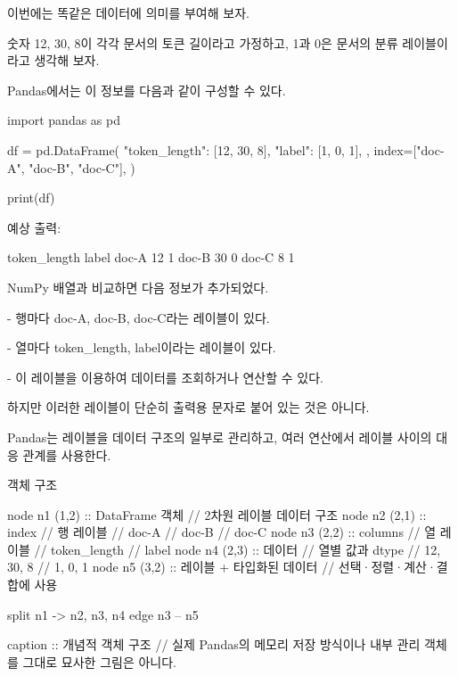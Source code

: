 이번에는 똑같은 데이터에 의미를 부여해 보자.

숫자 12, 30, 8이 각각 문서의 토큰 길이라고 가정하고, 1과 0은 문서의 분류 레이블이라고 생각해 보자.

Pandas에서는 이 정보를 다음과 같이 구성할 수 있다.

\begin{dhkcode}
import pandas as pd

df = pd.DataFrame(
    {
        "token_length": [12, 30, 8],
        "label": [1, 0, 1],
    },
    index=["doc-A", "doc-B", "doc-C"],
)

print(df)
\end{dhkcode}

예상 출력:

\begin{dhkzsh}
       token_length  label
doc-A            12      1
doc-B            30      0
doc-C             8      1
\end{dhkzsh}

NumPy 배열과 비교하면 다음 정보가 추가되었다.

\begin{dhksmry}
   - 행마다 doc-A, doc-B, doc-C라는 레이블이 있다.

   - 열마다 token_length, label이라는 레이블이 있다.

   - 이 레이블을 이용하여 데이터를 조회하거나 연산할 수 있다.
\end{dhksmry}

하지만 이러한 레이블이 단순히 출력용 문자로 붙어 있는 것은 아니다.

Pandas는 레이블을 데이터 구조의 일부로 관리하고, 여러 연산에서 레이블 사이의 대응 관계를 사용한다.

\begin{dhknote}
\begin{dhksmry}[centered]
객체 구조
\end{dhksmry}
\end{dhknote}

\begin{dhkgraph}[uniform]
node n1 (1,2) :: DataFrame 객체 // 2차원 레이블 데이터 구조
node n2 (2,1) :: index // 행 레이블 // doc-A // doc-B // doc-C
node n3 (2,2) :: columns // 열 레이블 // token_length // label
node n4 (2,3) :: 데이터 // 열별 값과 dtype // 12, 30, 8 // 1, 0, 1
node n5 (3,2) :: 레이블 + 타입화된 데이터 // 선택·정렬·계산·결합에 사용

split n1 -> n2, n3, n4
edge n3 -- n5

caption :: 개념적 객체 구조 // 실제 Pandas의 메모리 저장 방식이나 내부 관리 객체를 그대로 묘사한 그림은 아니다.
\end{dhkgraph}

